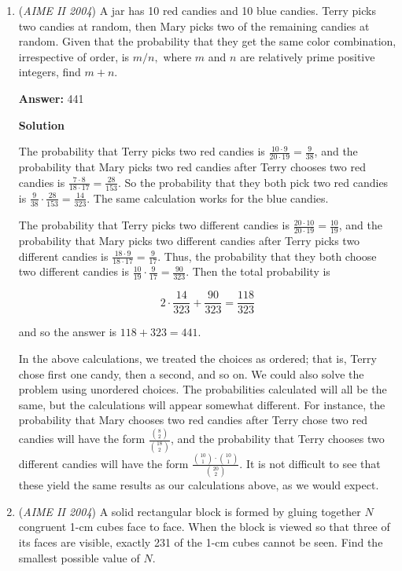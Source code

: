 \begin{enumerate}
 


	\item (\textit{AIME II 2004}) A jar has 10 red candies and 10 blue candies. Terry picks two candies at random, then Mary picks two of the remaining candies at random. Given that the probability that they get the same color combination, irrespective of order, is $m/n,$ where $m$ and $n$ are relatively prime positive integers, find $m+n.$

 \textbf{Answer: }441



\textbf{Solution}

The probability that Terry picks two red candies is $\frac{10 \cdot 9}{20 \cdot 19} = \frac{9}{38}$, and the probability that Mary picks two red candies after Terry chooses two red candies is $\frac{7\cdot8}{18\cdot17} = \frac{28}{153}$.  So the probability that they both pick two red candies is $\frac{9}{38} \cdot \frac{28}{153} = \frac{14}{323}$.  The same calculation works for the blue candies.  

 The probability that Terry picks two different candies is $\frac{20\cdot10}{20\cdot19} = \frac{10}{19}$, and the probability that Mary picks two different candies after Terry picks two different candies is $\frac{18\cdot 9}{18\cdot 17} = \frac{9}{17}$. Thus, the probability that they both choose two different candies is $\frac{10}{19}\cdot\frac{9}{17} = \frac{90}{323}$.  Then the total probability is

 
 \[2 \cdot \frac{14}{323} + \frac{90}{323} = \frac{118}{323}\]

 and so the answer is $118 + 323 = \boxed{441}$.

 
In the above calculations, we treated the choices as ordered; that is, Terry chose first one candy, then a second, and so on.  We could also solve the problem using unordered choices.  The probabilities calculated will all be the same, but the calculations will appear somewhat different.  For instance, the probability that Mary chooses two red candies after Terry chose two red candies will have the form $\frac{{8\choose 2}}{{18 \choose 2}}$, and the probability that Terry chooses two different candies will have the form $\frac{{10\choose 1}\cdot{10\choose 1}}{{20\choose2}}$.  It is not difficult to see that these yield the same results as our calculations above, as we would expect.

 


	\item (\textit{AIME II 2004}) A solid rectangular block is formed by gluing together $N$ congruent 1-cm cubes face to face. When the block is viewed so that three of its faces are visible, exactly 231 of the 1-cm cubes cannot be seen. Find the smallest possible value of $N.$


\end{enumerate}
